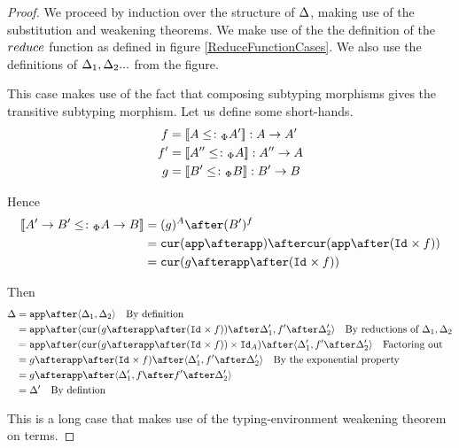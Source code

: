\documentclass{Report}
\begin{document}
\begin{proof}
    We proceed by induction over the structure of $\Delta$, making use of the substitution and weakening theorems. We make use of the the definition of the $reduce$ function as defined in figure \ref{ReduceFunctionCases}. We also use the definitions of $\Delta_1, \Delta_2 ...$ from the figure. 
    
    This case makes use of the fact that composing subtyping morphisms gives the transitive subtyping morphism. Let us define some short-hands.
        \begin{align*}
            f & = {\bf [\![}A\leq\colon_\Phi A'{\bf ]\!]}: A\rightarrow A' \\
            f' & = {\bf [\![}A''\leq\colon_\Phi A{\bf ]\!]}: A'' \rightarrow A \\
            g & = {\bf [\![}B' \leq\colon_\Phi B{\bf ]\!]}: B' \rightarrow B \\
        \end{align*}

        Hence 
        \begin{align*}
            \deno{\fntype{A'}{B'}\subtypep \ab} & = (g)^A \after (B')^f \\
            & = \cur{\app\after \app}\after\cur{\app\after(\Id{}\times f)}\\
            & = \cur {g\after\app\after(\Id{}\times f)}
        \end{align*}

        Then 
        \begin{align*}
            \D & = \app\after\pr{\D_1}{\D_2}\qt{By definition}\\
            & = \app\after\pr{\cur {g\after\app\after(\Id{}\times f)}\after\D'_1}{f'\after\D'_2}\qt{By reductions of $\D_1, \D_2$}\\
            & = \app\after(\cur {g\after\app\after(\Id{}\times f)}\times\Id{A})\after\pr{\D'_1}{f'\after\D'_2} \qt{Factoring out}\\
            & = g\after\app\after(\Id{}\times f)\after\pr{\D'_1}{f'\after\D'_2}\qt{By the exponential property}\\
            & = g\after\app\after\pr{\D'_1}{f\after f'\after \D'_2}\\
            & = \D'\qt{By defintion}
        \end{align*}
        

    This is a long case that makes use of the typing-environment weakening theorem on terms.


\end{proof}
\end{document}
